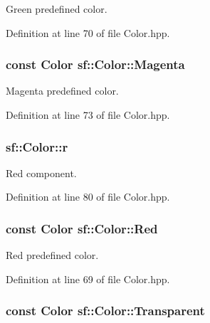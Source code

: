 Green predefined color. 



Definition at line 70 of file Color.\-hpp.

\hypertarget{classsf_1_1_color_a6fe70d90b65b2163dd066a84ac00426c}{
\subsubsection[{Magenta}]{\setlength{\rightskip}{0pt plus 5cm}const {\bf Color} sf\-::\-Color\-::\-Magenta\hspace{0.3cm}{\ttfamily [static]}}}\label{classsf_1_1_color_a6fe70d90b65b2163dd066a84ac00426c}


Magenta predefined color. 



Definition at line 73 of file Color.\-hpp.

\hypertarget{classsf_1_1_color_a6a5256ca24a4f9f0e0808f6fc23e01e1}{
\subsubsection[{r}]{ sf\-::\-Color\-::r}}\label{classsf_1_1_color_a6a5256ca24a4f9f0e0808f6fc23e01e1}


Red component. 



Definition at line 80 of file Color.\-hpp.

\hypertarget{classsf_1_1_color_a127dbf55db9c07d0fa8f4bfcbb97594a}{
\subsubsection[{Red}]{\setlength{\rightskip}{0pt plus 5cm}const {\bf Color} sf\-::\-Color\-::\-Red\hspace{0.3cm}{\ttfamily [static]}}}\label{classsf_1_1_color_a127dbf55db9c07d0fa8f4bfcbb97594a}


Red predefined color. 



Definition at line 69 of file Color.\-hpp.

\hypertarget{classsf_1_1_color_a569b45471737f770656f50ae7bbac292}{
\subsubsection[{Transparent}]{\setlength{\rightskip}{0pt plus 5cm}const {\bf Color} sf\-::\-Color\-::\-Transparent\hspace{0.3cm}{\ttfamily [static]}}}\label{classsf_1_1_color_a569b45471737f770656f50ae7bbac292}



